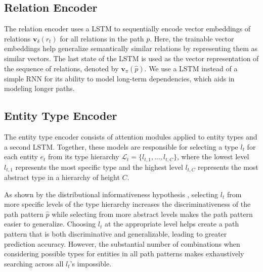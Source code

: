 \documentclass[letterpaper]{article} %
\begin{document}
\subsection{Relation Encoder}

The relation encoder uses a LSTM \cite{lstm} to sequentially encode vector embeddings of relations $\bm{v}_\delta(r_t)$ for all relations in the path $p$. Here, the trainable vector embeddings help generalize semantically similar relations by representing them as similar vectors. The last state of the LSTM is used as the vector representation of the sequence of relations, denoted by $\bm{v}_\pi(\hat{p})$. We use a LSTM instead of a simple RNN for its ability to model long-term dependencies, which aids in modeling longer paths.

\subsection{Entity Type Encoder}

The entity type encoder consists of attention modules applied to entity types and a second LSTM.
Together, these models are responsible for selecting a type $l_t$ for each entity $e_t$ from its type hierarchy $\mathcal{L}_t = \{ l_{t,1},...,l_{t,C}\}$, where the lowest level $l_{t,1}$ represents the most specific type and the highest level $l_{t,C}$ represents the most abstract type in a hierarchy of height $C$.

As shown by the distributional informativeness hypothesis \cite{santus2014hypernym}, selecting $l_t$ from more specific levels of the type hierarchy increases the discriminativeness of the path pattern $\hat{p}$ while selecting from more abstract levels makes the path pattern easier to generalize. Choosing $l_t$ at the appropriate level helps create a path pattern that is both discriminative and generalizable, leading to greater prediction accuracy. However, the substantial number of combinations when considering possible types for entities in all path patterns makes exhaustively searching across all $l_t$'s impossible.
\end{document}
